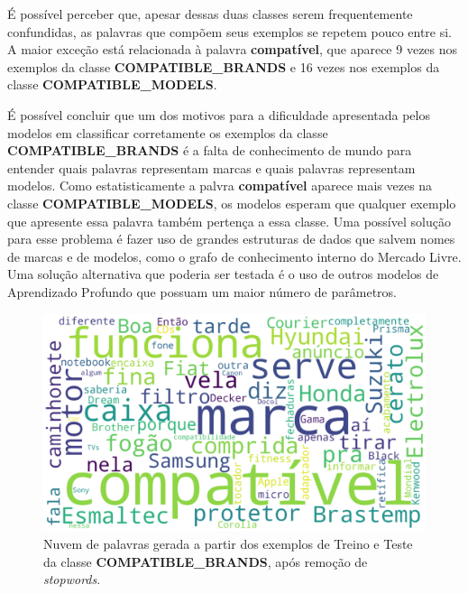 É possível perceber que, apesar dessas duas classes serem frequentemente confundidas, as palavras que compõem seus exemplos se repetem pouco entre si. A maior exceção está relacionada à palavra \textbf{compatível}, que aparece 9 vezes nos exemplos da classe \textbf{COMPATIBLE\_BRANDS} e 16 vezes nos exemplos da classe \textbf{COMPATIBLE\_MODELS}.

É possível concluir que um dos motivos para a dificuldade apresentada pelos modelos em classificar corretamente os exemplos da classe \textbf{COMPATIBLE\_BRANDS} é a falta de conhecimento de mundo para entender quais palavras representam marcas e quais palavras representam modelos. Como estatisticamente a palvra \textbf{compatível} aparece mais vezes na classe \textbf{COMPATIBLE\_MODELS}, os modelos esperam que qualquer exemplo que apresente essa palavra também pertença a essa classe. Uma possível solução para esse problema é fazer uso de grandes estruturas de dados que salvem nomes de marcas e de modelos, como o grafo de conhecimento interno do Mercado Livre. Uma solução alternativa que poderia ser testada é o uso de outros modelos de Aprendizado Profundo que possuam um maior número de parâmetros.

\begin{figure}[!ht]
    \centering
	\includegraphics[width=1\linewidth]{figuras/compatible_brands.png}
	\caption{Nuvem de palavras gerada a partir dos exemplos de Treino e Teste da classe \textbf{COMPATIBLE\_BRANDS}, após remoção de \textit{stopwords}.}
	\label{fig:compatible_brands}
\end{figure}

